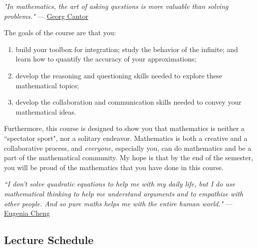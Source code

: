 \documentclass[11pt]{article}
\begin{document}
\begin{center}
    \textit{"In mathematics, the art of asking questions is more valuable than solving problems."} --- \href{https://en.wikipedia.org/wiki/Georg_Cantor}{Georg Cantor}
\end{center}

The goals of the course are that you: 
\begin{enumerate}[label-format={\arabic*.}]
    \item build your toolbox for integration; study the behavior of the infinite; and learn how to quantify the accuracy of your approximations;
    \item develop the reasoning and questioning skills needed to explore these mathematical topics;
    \item develop the collaboration and communication skills needed to convey your mathematical ideas.
\end{enumerate}

Furthermore, this course is designed to show you that mathematics is neither a ``spectator sport", nor a solitary endeavor.  Mathematics is both a creative and a collaborative process, and \textit{everyone}, especially you, can do mathematics and be a part of the mathematical community.  My hope is that by the end of the semester, you will be proud of the mathematics that you have done in this course.

\begin{center}
    \textit{``I don't solve quadratic equations to help me with my daily life, but I do use mathematical thinking to help me understand arguments and to empathize with other people.  And so pure maths helps me with the entire human world."} --- \href{http://eugeniacheng.com/}{Eugenia Cheng}
\end{center}

\newpage

\subsection{Lecture Schedule}
\end{document}
